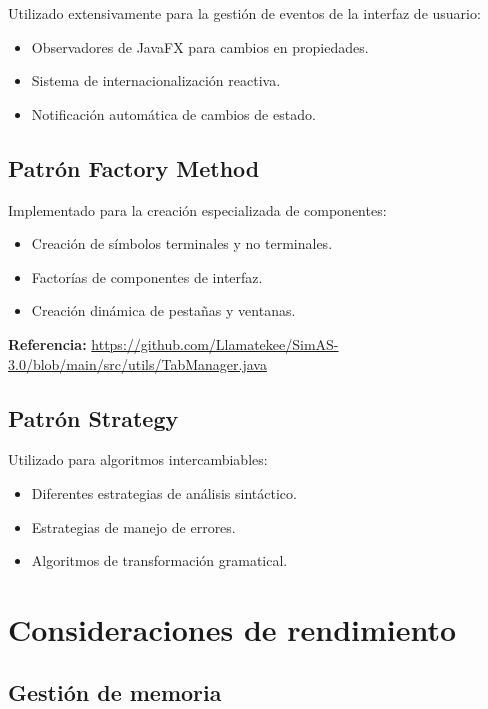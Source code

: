 Utilizado extensivamente para la gestión de eventos de la interfaz de usuario:

\begin{itemize}
    \item Observadores de JavaFX para cambios en propiedades.
    \item Sistema de internacionalización reactiva.
    \item Notificación automática de cambios de estado.
\end{itemize}

\subsection{Patrón Factory Method}

Implementado para la creación especializada de componentes:

\begin{itemize}
    \item Creación de símbolos terminales y no terminales.
    \item Factorías de componentes de interfaz.
    \item Creación dinámica de pestañas y ventanas.
\end{itemize}

\textbf{Referencia:} \url{https://github.com/Llamatekee/SimAS-3.0/blob/main/src/utils/TabManager.java}

\subsection{Patrón Strategy}

Utilizado para algoritmos intercambiables:

\begin{itemize}
    \item Diferentes estrategias de análisis sintáctico.
    \item Estrategias de manejo de errores.
    \item Algoritmos de transformación gramatical.
\end{itemize}

\section{Consideraciones de rendimiento}

\subsection{Gestión de memoria}

